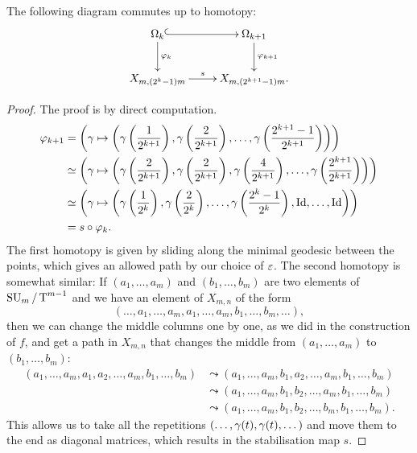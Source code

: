 \begin{lemma}
  \label{lem:com}
  The following diagram commutes up to homotopy:
  \[ \xymatrix{\Omega_k \ar@{^(->}[r] \ar[d]^{\varphi_k} & \Omega_{k+1}
  \ar[d]^{\varphi_{k+1}} \\
  X_{m,(2^k-1)m} \ar[r]^-{s} & X_{m,(2^{k+1}-1)m}. } \]
\end{lemma}
\begin{proof}
  The proof is by direct computation.
  \begin{align*}
    \varphi_{k+1} &= \left( \gamma \mapsto \left(
        \gamma\left(\frac{1}{2^{k+1}}\right),
        \gamma\left(\frac{2}{2^{k+1}}\right), \dots,
        \gamma\left(\frac{2^{k+1}-1}{2^{k+1}}\right) \right)\right) \\
    &\simeq \left(\gamma \mapsto \left( \gamma\left(\frac{2}{2^{k+1}}\right),
      \gamma\left(\frac{2}{2^{k+1}}\right),
      \gamma\left(\frac{4}{2^{k+1}}\right), \dots,
      \gamma\left(\frac{2^{k+1}}{2^{k+1}}\right) \right)\right) \\
    &\simeq \left(\gamma\mapsto \left( \gamma\left(\frac{1}{2^{k}}\right),
      \gamma\left(\frac{2}{2^{k}}\right), \dots,
      \gamma\left(\frac{2^k-1}{2^k}\right), \operatorname{Id},\dots,\operatorname{Id} \right) \right)\\
    &= s\circ \varphi_k.
  \end{align*}
  The first homotopy is given by sliding along the minimal geodesic
  between the points, which gives an allowed path by our choice of
  $\varepsilon$. The second homotopy is somewhat similar: If $(a_1,\dots,a_m)$
  and $(b_1,\dots,b_m)$ are two elements of $\operatorname{SU}_{m}/\operatorname{T}^{m-1}$ and we have an
  element of $X_{m,n}$ of the form
  \[ \left( \dots, a_1,\dots,a_m,a_1,\dots,a_m,b_1,\dots,b_m,\dots
  \right), \]
  then we can change the middle columns one by one, as we did in
  the construction of $f$, and get a path in $X_{m,n}$ that changes
  the middle from $(a_1,\dots,a_m)$ to $(b_1,\dots,b_m)$:
  \begin{align*}
    \left(a_1,\dots,a_m,a_1,a_2,\dots,a_m,b_1,\dots,b_m \right)
    &\leadsto
    \left(a_1,\dots,a_m,b_1,a_2,\dots,a_m,b_1,\dots,b_m\right) \\ 
    &\leadsto
    \left(a_1,\dots,a_m,b_1,b_2,\dots,a_m,b_1,\dots,b_m\right) \\  
    &\leadsto
    \left(a_1,\dots,a_m,b_1,b_2,\dots,b_m,b_1,\dots,b_m\right).  
  \end{align*}
  This allows us to take all the repetitions
  $\left(\dots,\gamma(t),\gamma(t),\dots\right)$ and move them to the end as
  diagonal matrices, which results in the stabilisation map $s$.
\end{proof}

